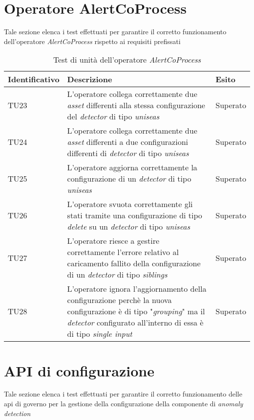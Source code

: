 \section{Operatore AlertCoProcess}
Tale sezione elenca i test effettuati per garantire il corretto funzionamento dell'operatore \textit{AlertCoProcess} rispetto ai requisiti prefissati

{
\centering
\begin{longtable}{L{3cm} L{8.5cm} L{2cm}}
\caption{Test di unità dell'operatore \textit{AlertCoProcess}}\\
\textbf{Identificativo} &
\textbf{Descrizione}&
\textbf{Esito}\\
\endhead
\hline

TU23 & L'operatore collega correttamente due \textit{asset} differenti alla stessa configurazione del \textit{detector} di tipo \textit{uniseas} & Superato\\
\hline
TU24 & L'operatore collega correttamente due \textit{asset} differenti a due configurazioni differenti di \textit{detector} di tipo \textit{uniseas} & Superato \\
\hline
TU25 &  L'operatore aggiorna correttamente la configurazione di un \textit{detector} di tipo \textit{uniseas} & Superato\\
\hline
TU26 & L'operatore svuota correttamente gli stati tramite una configurazione di tipo \textit{delete} su un \textit{detector} di tipo \textit{uniseas} & Superato \\
\hline
TU27 & L'operatore riesce a gestire correttamente l'errore relativo al caricamento fallito della configurazione di un \textit{detector} di tipo \textit{siblings} & Superato\\
\hline
TU28 & L'operatore ignora l'aggiornamento della configurazione perchè la nuova configurazione è di tipo "\textit{grouping}" ma il \textit{detector} configurato all'interno di essa è di tipo \textit{single input} & Superato \\
\hline
\end{longtable}
}

\section{API di configurazione}
Tale sezione elenca i test effettuati per garantire il corretto funzionamento delle \gls{api} di governo per la gestione della configurazione della componente di \textit{anomaly detection}

